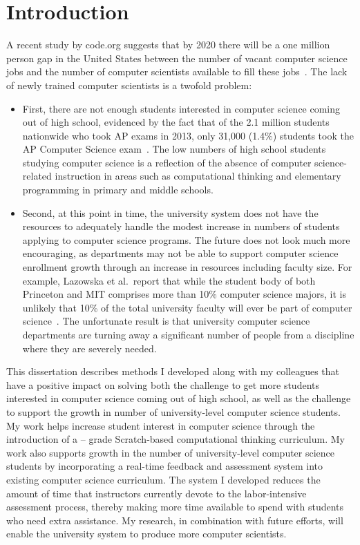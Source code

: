 \chapter{Introduction} \label{chap:introduction}
A recent study by code.org suggests that by 2020 there will be a one million
person gap in the United States between the number of vacant computer science
jobs and the number of computer scientists available to fill these
jobs~\cite{codeorg:2013}. The lack of newly trained computer scientists is a
twofold problem:

\begin{itemize}
\item First, there are not enough students interested in computer science
  coming out of high school, evidenced by the fact that of the 2.1 million
  students nationwide who took AP exams in 2013, only 31,000 (1.4\%) students
  took the AP Computer Science exam~\cite{cb:2013}. The low numbers of high
  school students studying computer science is a reflection of the absence of
  computer science-related instruction in areas such as computational thinking
  and elementary programming in primary and middle schools.
\item Second, at this point in time, the university system does not have the
  resources to adequately handle the modest increase in numbers of students
  applying to computer science programs. The future does not look much more
  encouraging, as departments may not be able to support computer science
  enrollment growth through an increase in resources including faculty
  size. For example, Lazowska et al.\ report that while the student body of
  both Princeton and MIT comprises more than 10\% computer science majors, it
  is unlikely that 10\% of the total university faculty will ever be part of
  computer science~\cite{lazowska:2014}. The unfortunate result is that
  university computer science departments are turning away a significant number
  of people from a discipline where they are severely needed.
\end{itemize}

This dissertation describes methods I developed along with my colleagues that
have a positive impact on solving both the challenge to get more students
interested in computer science coming out of high school, as well as the
challenge to support the growth in number of university-level computer science
students. My work helps increase student interest in computer science through
the introduction of a -- grade Scratch-based computational
thinking curriculum. My work also supports growth in the number of
university-level computer science students by incorporating a real-time
feedback and assessment system into existing computer science curriculum. The
system I developed reduces the amount of time that instructors currently devote
to the labor-intensive assessment process, thereby making more time available
to spend with students who need extra assistance. My research, in combination
with future efforts, will enable the university system to produce more computer
scientists.

